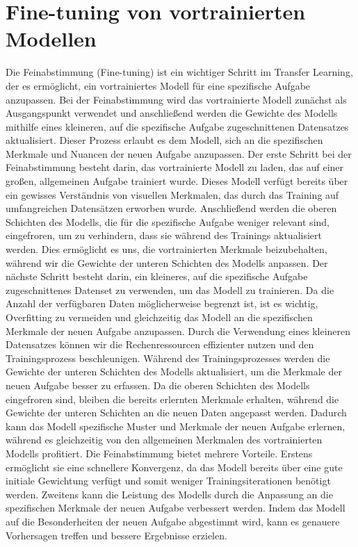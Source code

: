 \section{Fine-tuning von vortrainierten Modellen}

    Die Feinabstimmung (Fine-tuning) ist ein wichtiger Schritt im Transfer Learning, der es ermöglicht, ein vortrainiertes Modell für eine spezifische Aufgabe anzupassen. 
    Bei der Feinabstimmung wird das vortrainierte Modell zunächst als Ausgangspunkt verwendet und anschließend werden die Gewichte des Modells mithilfe eines kleineren, auf die spezifische Aufgabe zugeschnittenen Datensatzes aktualisiert. 
    Dieser Prozess erlaubt es dem Modell, sich an die spezifischen Merkmale und Nuancen der neuen Aufgabe anzupassen.
    Der erste Schritt bei der Feinabstimmung besteht darin, das vortrainierte Modell zu laden, das auf einer großen, allgemeinen Aufgabe trainiert wurde. 
    Dieses Modell verfügt bereits über ein gewisses Verständnis von visuellen Merkmalen, das durch das Training auf umfangreichen Datensätzen erworben wurde. 
    Anschließend werden die oberen Schichten des Modells, die für die spezifische Aufgabe weniger relevant sind, eingefroren, um zu verhindern, dass sie während des Trainings aktualisiert werden. 
    Dies ermöglicht es uns, die vortrainierten Merkmale beizubehalten, während wir die Gewichte der unteren Schichten des Modells anpassen.
    Der nächste Schritt besteht darin, ein kleineres, auf die spezifische Aufgabe zugeschnittenes Datenset zu verwenden, um das Modell zu trainieren. 
    Da die Anzahl der verfügbaren Daten möglicherweise begrenzt ist, ist es wichtig, Overfitting zu vermeiden und gleichzeitig das Modell an die spezifischen Merkmale der neuen Aufgabe anzupassen. 
    Durch die Verwendung eines kleineren Datensatzes können wir die Rechenressourcen effizienter nutzen und den Trainingsprozess beschleunigen.
    Während des Trainingsprozesses werden die Gewichte der unteren Schichten des Modells aktualisiert, um die Merkmale der neuen Aufgabe besser zu erfassen. 
    Da die oberen Schichten des Modells eingefroren sind, bleiben die bereits erlernten Merkmale erhalten, während die Gewichte der unteren Schichten an die neuen Daten angepasst werden. 
    Dadurch kann das Modell spezifische Muster und Merkmale der neuen Aufgabe erlernen, während es gleichzeitig von den allgemeinen Merkmalen des vortrainierten Modells profitiert.
    Die Feinabstimmung bietet mehrere Vorteile. 
    Erstens ermöglicht sie eine schnellere Konvergenz, da das Modell bereits über eine gute initiale Gewichtung verfügt und somit weniger Trainingsiterationen benötigt werden. 
    Zweitens kann die Leistung des Modells durch die Anpassung an die spezifischen Merkmale der neuen Aufgabe verbessert werden.
    Indem das Modell auf die Besonderheiten der neuen Aufgabe abgestimmt wird, kann es genauere Vorhersagen treffen und bessere Ergebnisse erzielen.

